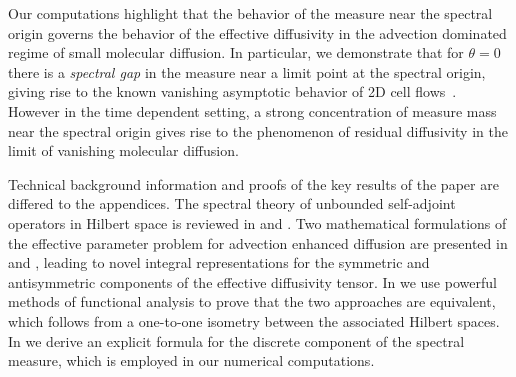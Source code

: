 \documentclass[amsa]{ipart}
\begin{document}
Our computations highlight that the
behavior of the measure 
near the spectral origin governs the behavior of the effective
diffusivity in the advection dominated regime of small molecular
diffusion. In particular, we demonstrate that for $\theta=0$ there is a
\emph{spectral gap} in the measure near a limit point at the spectral
origin, giving rise to the known vanishing asymptotic behavior of 2D
cell
flows~\cite{Fannjiang:1994:SIAM_JAM:333,Novikov:2005:CPAM:867}. However
in the time dependent setting, a strong concentration of measure mass 
near the spectral origin gives rise to the phenomenon of residual
diffusivity in the limit of vanishing molecular diffusion.




Technical background information and proofs of the key results of the
paper are differed to the appendices. The spectral theory of unbounded
self-adjoint operators in Hilbert space is reviewed in 
 and . Two
mathematical formulations of the effective parameter problem for
advection enhanced diffusion are presented in
 and , leading
to novel integral representations for the symmetric and antisymmetric 
components of the effective diffusivity tensor. In
 we use powerful methods of
functional analysis to prove that the two approaches are equivalent,
which follows from a one-to-one isometry between the associated
Hilbert spaces. In  we derive an explicit 
formula for the discrete component of the spectral measure, which is
employed in our numerical computations.
\end{document}
